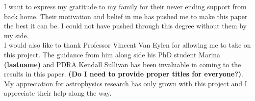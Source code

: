 \clearpage
\clearpage
\thispagestyle{empty}

\vspace*{\fill}

\begin{center}
\begin{minipage}{0.85\textwidth}

\centering

\vspace{1em}

\raggedright
I want to express my gratitude to my family for their never ending support from back home. Their motivation and belief in me has pushed me to make this paper the best it can be. I could not have pushed through this degree without them by my side.
\\ \vspace{1em}
I would also like to thank Professor Vincent Van Eylen for allowing me to take on this project. The guidance from him along side his PhD student Marina \textbf{(lastname)} and PDRA Kendall Sullivan has been invaluable in coming to the results in this paper. \textbf{(Do I need to provide proper titles for everyone?)}. My appreciation for astrophysics research has only grown with this project and I appreciate their help along the way.

\end{minipage}
\end{center}

\vspace*{\fill}

\clearpage

